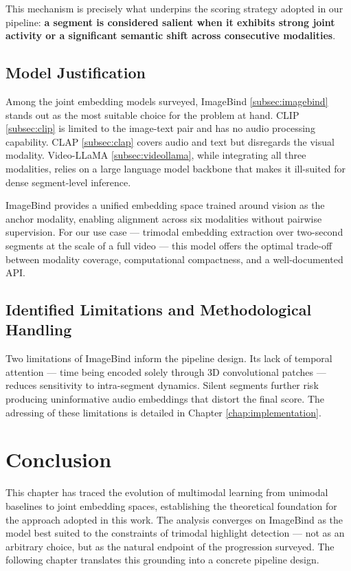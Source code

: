 \documentclass[12pt,a4paper,oneside,english]{book}
\begin{document}
This mechanism is precisely what underpins the scoring strategy adopted in our pipeline: 
\textbf{a segment is considered salient when it exhibits strong joint activity or a significant semantic shift across consecutive modalities}.

\subsection{Model Justification}
\label{subsec:model_justif}
Among the joint embedding models surveyed, ImageBind \ref{subsec:imagebind} stands out as the most suitable choice for the problem at hand. CLIP \ref{subsec:clip} is 
limited to the image-text pair and has no audio processing capability. CLAP \ref{subsec:clap} covers audio and text but disregards the visual modality. 
Video-LLaMA \ref{subsec:videollama}, while integrating all three modalities, relies on a large language model backbone that makes it ill-suited for dense segment-level inference.

ImageBind provides a unified embedding space trained around vision as the anchor modality, enabling alignment across six modalities without pairwise supervision. 
For our use case — trimodal embedding extraction over two-second segments at the scale of a full video — this model offers the optimal trade-off between modality coverage, computational compactness, and a well-documented API.
\subsection{Identified Limitations and Methodological Handling}
\label{subsec:model_limitations}
Two limitations of ImageBind inform the pipeline design. Its lack of temporal attention — time being encoded solely through 3D convolutional patches — reduces sensitivity to intra-segment dynamics. Silent segments further risk producing uninformative audio embeddings that distort the final score. 
The adressing of these limitations is detailed in Chapter \ref{chap:implementation}.

\section*{Conclusion}%
This chapter has traced the evolution of multimodal learning from unimodal baselines to joint embedding spaces, establishing the theoretical foundation for the approach adopted in this work. The analysis converges on ImageBind as the model best suited to the constraints of trimodal highlight detection — not as an arbitrary choice, but as the natural endpoint of the progression surveyed. 
The following chapter translates this grounding into a concrete pipeline design.
\end{document}
